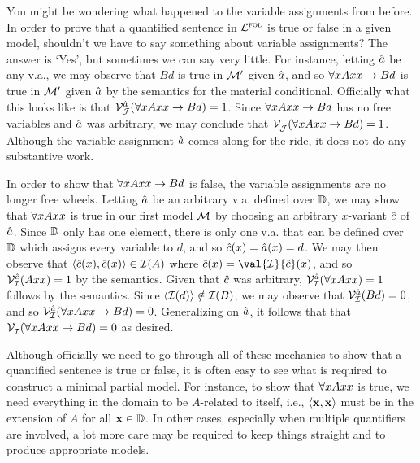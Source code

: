 You might be wondering what happened to the variable assignments from before.
In order to prove that a quantified sentence in $\mathcal{L}^{\textsc{fol}}$ is true or false in a given model, shouldn't we have to say something about variable assignments?
The answer is `Yes', but sometimes we can say very little.
For instance, letting $\hat{a}$ be any v.a., we may observe that $Bd$ is true in $\mathcal{M}'$ given $\hat{a}$, and so $\forall xAxx \rightarrow Bd$ is true in $\mathcal{M}'$ given $\hat{a}$ by the semantics for the material conditional.
Officially what this looks like is that $\mathcal{V}_{\mathcal{J}}^{\hat{a}}(\forall xAxx \rightarrow Bd)=1$.
Since $\forall xAxx \rightarrow Bd$ has no free variables and $\hat{a}$ was arbitrary, we may conclude that $\mathcal{V}_{\mathcal{J}}^{}(\forall xAxx \rightarrow Bd)=1$. 
Although the variable assignment $\hat{a}$ comes along for the ride, it does not do any substantive work.

In order to show that $\forall xAxx \rightarrow Bd$ is false, the variable assignments are no longer free wheels.
Letting $\hat{a}$ be an arbitrary v.a. defined over $\mathbb{D}$, we may show that $\forall xAxx$ is true in our first model $\mathcal{M}$ by choosing an arbitrary $x$-variant $\hat{c}$ of $\hat{a}$. %
Since $\mathbb{D}$ only has one element, there is only one v.a. that can be defined over $\mathbb{D}$ which assigns every variable to $d$, and so $\hat{c}(x) = \hat{a}(x) = d$.
We may then observe that $\langle\hat{c}(x),\hat{c}(x)\rangle\in\mathcal{I}(A)$ where $\va{c}(x) = \val{\I}{\va{c}}(x)$, and so $\mathcal{V}_{\mathcal{I}}^{\hat{c}}(Axx)=1$ by the semantics.
Given that $\hat{c}$ was arbitrary, $\mathcal{V}_{\mathcal{I}}^{\hat{a}}(\forall xAxx)=1$ follows by the semantics.
Since $\langle\mathcal{I}(d)\rangle \notin \mathcal{I}(B)$, we may observe that $\mathcal{V}_{\mathcal{I}}^{\hat{a}}(Bd) = 0$, and so $\mathcal{V}_{\mathcal{I}}^{\hat{a}}(\forall xAxx \rightarrow Bd) = 0$.
Generalizing on $\hat{a}$, it follows that that $\mathcal{V}_{\mathcal{I}}^{}(\forall xAxx \rightarrow Bd) = 0$ as desired. 

Although officially we need to go through all of these mechanics to show that a quantified sentence is true or false, it is often easy to see what is required to construct a minimal partial model.
For instance, to show that $\forall xAxx$ is true, we need everything in the domain to be $A$-related to itself, i.e., $\langle\mathbf{x},\mathbf{x}\rangle$ must be in the extension of $A$ for all $\mathbf{x}\in\mathbb{D}$.
In other cases, especially when multiple quantifiers are involved, a lot more care may be required to keep things straight and to produce appropriate models.

